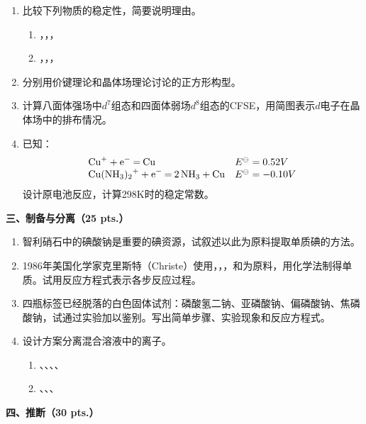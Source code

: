 \begin{enumerate}[label=\arabic*., start=1, itemsep=1.5ex]
\begin{enumerate}[label=(\arabic*), itemsep=1ex]
    \end{enumerate}
    \item 比较下列物质的稳定性，简要说明理由。
    \begin{enumerate}[label=(\arabic*), itemsep=1ex]
        \item {}，，，
        \item {}，，，
    \end{enumerate}
    \item 分别用价键理论和晶体场理论讨论的正方形构型。
    \item 计算八面体强场中$d^7$组态和四面体弱场$d^8$组态的CFSE，用简图表示$d$电子在晶体场中的排布情况。
    \item 已知：
    \[
    \begin{array}{ll}
    \ce{Cu^+ + e^- = Cu} & E^\ominus = 0.52V \\
    \ce{Cu(NH3)_2^+ + e^- = 2NH3 + Cu} & E^\ominus = -0.10V
    \end{array}
    \]
    设计原电池反应，计算298K时的稳定常数。
\end{enumerate}

\vspace{0.5cm}
\noindent\textbf{三、制备与分离（25 pts.）}

\begin{enumerate}[label=\arabic*., start=1, itemsep=1.5ex]
    \item 智利硝石中的碘酸钠是重要的碘资源，试叙述以此为原料提取单质碘的方法。
    \item 1986年美国化学家克里斯特（Christe）使用，，，和为原料，用化学法制得单质。试用反应方程式表示各步反应过程。
    \item 四瓶标签已经脱落的白色固体试剂：磷酸氢二钠、亚磷酸钠、偏磷酸钠、焦磷酸钠，试通过实验加以鉴别。写出简单步骤、实验现象和反应方程式。
    \item 设计方案分离混合溶液中的离子。
    \begin{enumerate}[label=(\arabic*), itemsep=1ex]
        \item {}、、、、
        \item {}、、、
    \end{enumerate}
\end{enumerate}

\vspace{0.5cm}
\noindent\textbf{四、推断（30 pts.）}

